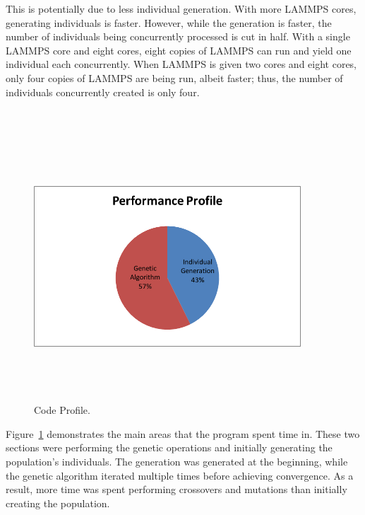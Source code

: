 \documentclass[letterpaper, 12pt]{article}
\begin{document}
\begin{flushleft}
This is potentially due to less individual generation.  With more LAMMPS cores, generating individuals is faster.  However, while the generation is faster, the number of individuals being concurrently processed is cut in half.  With a single LAMMPS core and eight cores, eight copies of LAMMPS can run and yield one individual each concurrently.  When LAMMPS is given two cores and eight cores, only four copies of LAMMPS are being run, albeit faster; thus, the number of individuals concurrently created is only four.

~\newline
\begin{figure}[H]
	\centering
	\includegraphics[width=10cm,height=10cm,keepaspectratio]{profile.png}
	\caption[Profiling]{Code Profile.}
	\label{fig:codeprofile}
\end{figure}

Figure~\ref{fig:codeprofile} demonstrates the main areas that the program spent time in.  These two sections were performing the genetic operations and initially generating the population's individuals.  The generation was generated at the beginning, while the genetic algorithm iterated multiple times before achieving convergence.  As a result, more time was spent performing crossovers and mutations than initially creating the population. \\


\end{flushleft}
\end{document}
